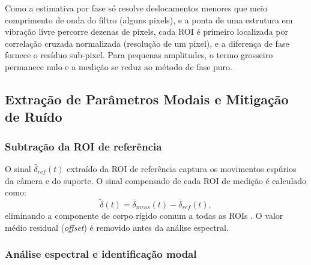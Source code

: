\documentclass[a4paper,10pt,twocolumn]{article}
\begin{document}
Como a estimativa por fase só resolve deslocamentos menores que meio comprimento de onda do filtro (alguns pixels), e a ponta de uma estrutura em vibração livre percorre dezenas de pixels, cada ROI é primeiro localizada por correlação cruzada normalizada (resolução de um pixel), e a diferença de fase fornece o resíduo sub-pixel. Para pequenas amplitudes, o termo grosseiro permanece nulo e a medição se reduz ao método de fase puro.

\subsection{Extração de Parâmetros Modais e Mitigação de Ruído}

\subsubsection{Subtração da ROI de referência}

O sinal $\bar{\delta}_{ref}(t)$ extraído da ROI de referência captura os movimentos espúrios da câmera e do suporte. O sinal compensado de cada ROI de medição é calculado como:
\begin{equation}
    \tilde{\delta}(t) = \bar{\delta}_{meas}(t) - \bar{\delta}_{ref}(t),
    \label{eq:compensacao}
\end{equation}
eliminando a componente de corpo rígido comum a todas as ROIs \cite{Mhatre2026, robotcamera2025}. O valor médio residual (\textit{offset}) é removido antes da análise espectral.

\subsubsection{Análise espectral e identificação modal}
\end{document}
